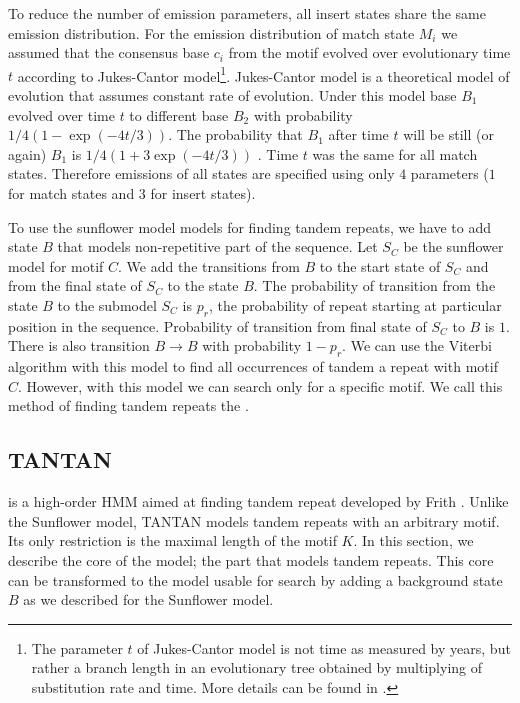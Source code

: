 To reduce the number of emission parameters, all insert states share the same
emission distribution. For the emission distribution of match state $M_i$ we
assumed that the consensus base $c_i$ from the motif evolved over evolutionary
time $t$ according to Jukes-Cantor model\footnote{ The parameter $t$ of
Jukes-Cantor model is not time as measured by years, but rather a branch length
in an evolutionary tree obtained by multiplying of substitution rate and time.
More details can be found in \cite{Durbin1998}.  }. Jukes-Cantor model is a
theoretical model of evolution that assumes constant rate of evolution. Under
this model base $B_1$ evolved over time $t$ to different base $B_2$  with
probability $1/4(1-\exp(-4t/3))$.  The probability that $B_1$ after time $t$
will be still (or again) $B_1$  is $1/4(1+3\exp(-4t/3))$ \cite{Durbin1998}.
Time $t$ was the same for all match states. Therefore emissions of all states
are specified using only $4$ parameters ($1$ for match states and $3$ for
insert states).

To use the sunflower model models for finding tandem repeats, we have to add
state $B$ that models non-repetitive part of the sequence. Let $S_C$ be the
sunflower model for motif $C$. We add the transitions from $B$ to the start
state of $S_C$ and from the final state of $S_C$ to the state $B$. The
probability of transition from the state $B$ to the submodel $S_C$ is $p_r$,
the probability of repeat starting at particular position in the sequence.
Probability of transition from final state of $S_C$ to $B$ is $1$.  There is
also transition $B\to B$ with probability $1-p_r$. We can use the Viterbi
algorithm with this model to find all occurrences of tandem a repeat with motif
$C$. However, with this model we can search only for a specific motif. We call
this method of finding tandem repeats the .

\subsection{TANTAN}\label{SECTION:TANTAN}

 is a high-order HMM aimed at finding tandem repeat
developed by Frith \cite{Frith2011}. Unlike the Sunflower model, TANTAN models
tandem repeats with an arbitrary motif. Its only restriction is the maximal
length of the motif $K$. In this section, we describe the core of the model;
the part that models tandem repeats. This core can be transformed to the model
usable for search by adding a background state $B$ as we described for the
Sunflower model.


